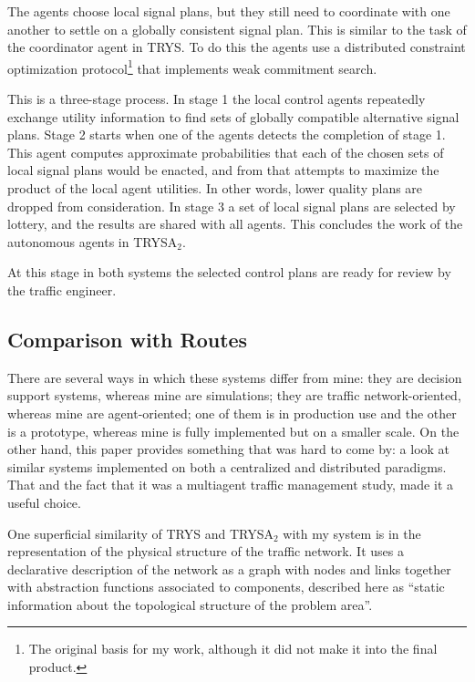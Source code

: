\documentclass[11pt,letterpaper,onecolumn,twoside,openright,final]{report}
\begin{document}
The agents choose local signal plans, but they still need to coordinate with one another to settle on a globally consistent signal plan.
This is similar to the task of the coordinator agent in TRYS.
To do this the agents use a distributed constraint optimization protocol\footnote{The original basis for my work, although it did not make it into the final product.} that implements weak commitment search\cite{yokoo1999}.

This is a three-stage process.
In stage 1 the local control agents repeatedly exchange utility information to find sets of globally compatible alternative signal plans.
Stage 2 starts when one of the agents detects the completion of stage 1.
This agent computes approximate probabilities that each of the chosen sets of local signal plans would be enacted, and from that attempts to maximize the product of the local agent utilities.
In other words, lower quality plans are dropped from consideration.
In stage 3 a set of local signal plans are selected by lottery, and the results are shared with all agents.
This concludes the work of the autonomous agents in TRYSA$_{2}$.

At this stage in both systems the selected control plans are ready for review by the traffic engineer.

\subsection{Comparison with Routes}
There are several ways in which these systems differ from mine: they are decision support systems, whereas mine are simulations; they are traffic network-oriented, whereas mine are agent-oriented; one of them is in production use and the other is a prototype, whereas mine is fully implemented but on a smaller scale.
On the other hand, this paper provides something that was hard to come by: a look at similar systems implemented on both a centralized and distributed paradigms.
That and the fact that it was a multiagent traffic management study, made it a useful choice.

One superficial similarity of TRYS and TRYSA$_{2}$ with my system is in the representation of the physical structure of the traffic network.
It uses a declarative description of the network as a graph with nodes and links together with abstraction functions associated to components, described here as ``static information about the topological structure of the problem area''.
\end{document}
